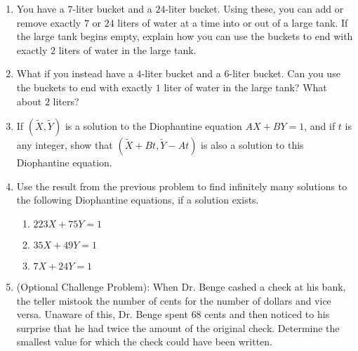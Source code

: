 \documentclass[12pt]{amsart}
\theoremstyle{definition}
\theoremstyle{remark}
\numberwithin{equation}{section}
\begin{document}
\begin{enumerate}
\item You have a $7$-liter bucket and a $24$-liter bucket. Using these, you can add or remove exactly $7$ or $24$ liters of water at a time into or out of a large tank. If the large tank begins empty, explain how you can use the buckets to end with exactly $2$ liters of water in the large tank.
\item What if you instead have a $4$-liter bucket and a $6$-liter bucket. Can you use the buckets to end with exactly $1$ liter of water in the large tank? What about $2$ liters?
\item If $(\widetilde{X},\widetilde{Y})$ is a solution to the Diophantine equation $AX+BY=1$, and if $t$ is any integer, show that $(\widetilde{X}+Bt,\widetilde{Y}-At)$ is also a solution to this Diophantine equation.
\item Use the result from the previous problem to find infinitely many solutions to the following Diophantine equations, if a solution exists.
\begin{enumerate}
\item $223X+75Y=1$
\item $35X+49Y=1$
\item $7X+24Y=1$
\end{enumerate}
\item (Optional Challenge Problem): When Dr. Benge cashed a check at his bank, the teller mistook the number of cents for the number of dollars and vice versa. Unaware of this, Dr. Benge spent $68$ cents and then noticed to his surprise that he had twice the amount of the original check. Determine the smallest value for which the check could have been written.
\end{enumerate}
\vfill
\end{document}
